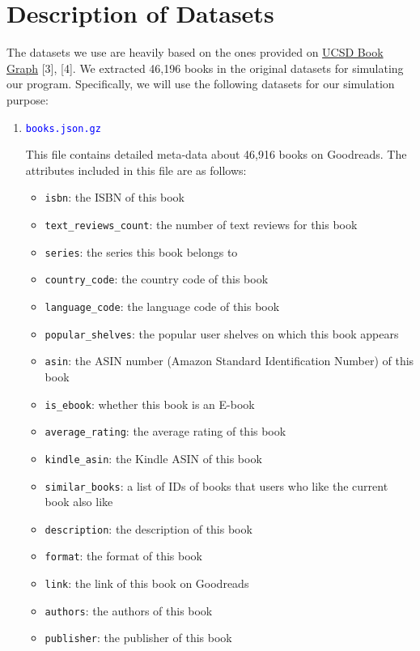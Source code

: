 \documentclass[fontsize=11pt]{article}
\begin{document}
\section*{Description of Datasets}
The datasets we use are heavily based on the ones provided on \href{https://sites.google.com/eng.ucsd.edu/ucsdbookgraph/home}{UCSD Book Graph} [3], [4]. We extracted 46,196 books in the original datasets for simulating our program. Specifically, we will use the following datasets for our simulation purpose:

\begin{enumerate}

\item \textcolor{blue}{\texttt{books.json.gz}}

This file contains detailed meta-data about 46,916 books on Goodreads. The attributes included in this file are as follows:
\begin{itemize}
\item \texttt{isbn}: the ISBN of this book
\item \texttt{text\_reviews\_count}: the number of text reviews for this book
\item \texttt{series}: the series this book belongs to
\item \texttt{country\_code}: the country code of this book
\item \texttt{language\_code}: the language code of this book
\item \texttt{popular\_shelves}: the popular user shelves on which this book appears
\item \texttt{asin}: the ASIN number (Amazon Standard Identification Number) of this book
\item \texttt{is\_ebook}: whether this book is an E-book
\item \texttt{average\_rating}: the average rating of this book
\item \texttt{kindle\_asin}: the Kindle ASIN of this book
\item \texttt{similar\_books}: a list of IDs of books that users who like the current book also like
\item \texttt{description}: the description of this book
\item \texttt{format}: the format of this book
\item \texttt{link}: the link of this book on Goodreads
\item \texttt{authors}: the authors of this book
\item \texttt{publisher}: the publisher of this book

\end{itemize}
\end{enumerate}
\end{document}

